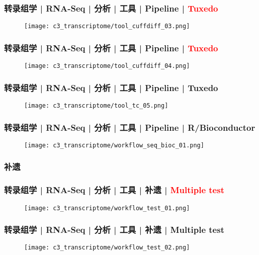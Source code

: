 \begin{frame}
  \frametitle{转录组学 | RNA-Seq | 分析 | 工具 | Pipeline | \textcolor{red}{Tuxedo}}
  \begin{figure}
    \centering
    \texttt{[image: c3\_transcriptome/tool\_cuffdiff\_03.png]}
  \end{figure}
\end{frame}

\begin{frame}
  \frametitle{转录组学 | RNA-Seq | 分析 | 工具 | Pipeline | \textcolor{red}{Tuxedo}}
  \begin{figure}
    \centering
    \texttt{[image: c3\_transcriptome/tool\_cuffdiff\_04.png]}
  \end{figure}
\end{frame}

\begin{frame}
  \frametitle{转录组学 | RNA-Seq | 分析 | 工具 | Pipeline | Tuxedo}
  \begin{figure}
    \centering
    \texttt{[image: c3\_transcriptome/tool\_tc\_05.png]}
  \end{figure}
\end{frame}

\begin{frame}
  \frametitle{转录组学 | RNA-Seq | 分析 | 工具 | Pipeline | R/Bioconductor}
  \begin{figure}
    \centering
    \texttt{[image: c3\_transcriptome/workflow\_seq\_bioc\_01.png]}
  \end{figure}
\end{frame}

\subsubsection{补遗}
\begin{frame}
  \frametitle{转录组学 | RNA-Seq | 分析 | 工具 | 补遗 | \textcolor{red}{Multiple test}}
  \begin{figure}
    \centering
    \texttt{[image: c3\_transcriptome/workflow\_test\_01.png]}
  \end{figure}
\end{frame}

\begin{frame}
  \frametitle{转录组学 | RNA-Seq | 分析 | 工具 | 补遗 | Multiple test}
  \begin{figure}
    \centering
    \texttt{[image: c3\_transcriptome/workflow\_test\_02.png]}
  \end{figure}
\end{frame}

